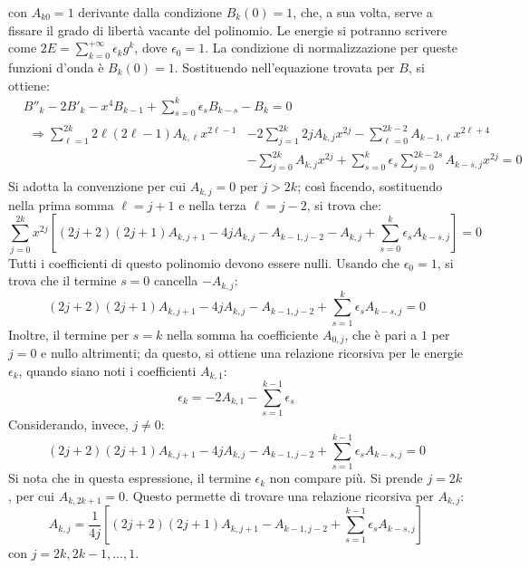 \documentclass[10pt, a4paper]{scrartcl} %
\numberwithin{equation}{section}
\theoremstyle{style2}
\theoremstyle{style1}
\begin{document}
con $A_{k0}=1 $ derivante dalla condizione $B_k(0) = 1$, che, a sua volta, serve a fissare il grado di libert\`a vacante del polinomio.
Le energie si potranno scrivere come $2E = \sum_{k=0}^{+\infty} \epsilon _k g^k$, dove $\epsilon _0 = 1$.
La condizione di normalizzazione per queste funzioni d'onda \`e $B_k(0) = 1$. 
Sostituendo nell'equazione trovata per $B$, si ottiene:
\[
	\begin{split}
		&B''_k - 2B'_k - x^4 B_{k-1} + \sum_{s=0}^{k} \epsilon _s B_{k-s} - B_k = 0\\
		&\begin{split}
			\Rightarrow \sum_{\ell =1}^{2k} 2\ell (2\ell -1) A_{k,\ell } x^{2\ell -1} &-2 \sum_{j=1}^{2k} 2j A_{k,j} x^{2j}  - \sum_{\ell =0}^{2k-2} A_{k-1,\ell } x^{2\ell +4} \\
			&- \sum_{j=0}^{2k} A_{k,j} x^{2j}  + \sum_{s=0}^{k} \epsilon _s \sum_{j=0}^{2k-2s} A_{k-s,j} x^{2j} =0
		\end{split}
	\end{split}
\] 
Si adotta la convenzione per cui $A_{k,j} = 0$ per $j > 2k$; cos\`i facendo, sostituendo nella prima somma $\ell = j +1$ e nella terza $\ell = j-2$, si trova che:
\begin{equation*}
	\sum_{j=0}^{2k} x^{2j}\left[ (2j+2)(2j+1) A_{k,j+1} -4j A_{k,j}  - A_{k-1,j-2} -A_{k,j} + \sum_{s=0}^{k} \epsilon _s A_{k-s,j}  \right]  = 0
\end{equation*}
Tutti i coefficienti di questo polinomio devono essere nulli. 
Usando che $\epsilon _0 = 1$, si trova che il termine $s=0$ cancella $-A_{k,j} $:
\begin{equation}
	(2j+2)(2j+1) A_{k,j+1} - 4j A_{k,j} - A_{k-1,j-2} + \sum_{s=1}^{k} \epsilon _s A_{k-s,j} =0
\end{equation}
Inoltre, il termine per $s=k$ nella somma ha coefficiente $A_{0,j} $, che \`e pari a $1$ per $j=0$ e nullo altrimenti; da questo, si ottiene una relazione ricorsiva per le energie $\epsilon _k$, quando siano noti i coefficienti $A_{k,1} $:
\begin{equation}
	\epsilon _k = -2A_{k,1} - \sum_{s=1}^{k-1} \epsilon _s
\end{equation}
Considerando, invece, $j\neq 0 $:
\begin{equation*}
	(2j+2)(2j+1) A_{k,j+1} - 4j A_{k,j} - A_{k-1,j-2} + \sum_{s=1}^{k-1} \epsilon _s A_{k-s,j} =0
\end{equation*}
Si nota che in questa espressione, il termine $\epsilon _k$ non compare pi\`u.
Si prende $j=2k$, per cui $A_{k,2k+1} =0$. 
Questo permette di trovare una relazione ricorsiva per $A_{k,j} $:
\begin{equation}
	A_{k,j} = \frac{1}{4j} \left[ (2j+2)(2j+1)A_{k,j+1} -A_{k-1,j-2} +\sum_{s=1}^{k-1} \epsilon _s A_{k-s,j}  \right] 
\end{equation}
con $j=2k,2k-1, \ldots, 1$.
\end{document}
